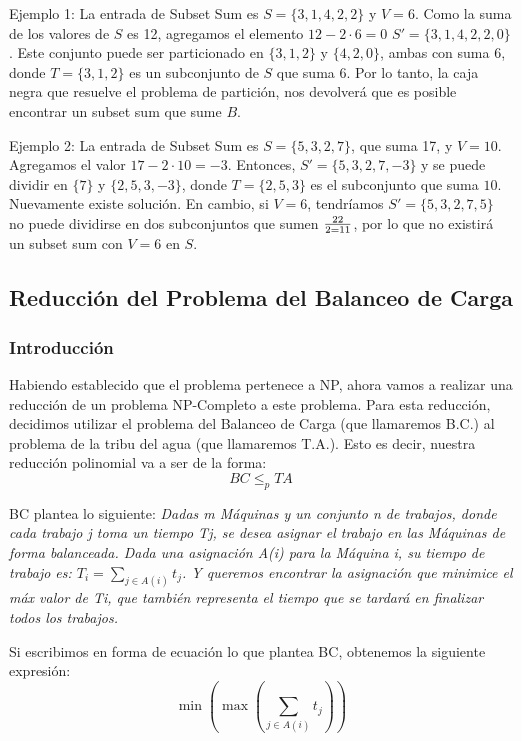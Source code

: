 \documentclass{article}
\begin{document}
Ejemplo 1: La entrada de Subset Sum es \( S = \{3, 1, 4, 2, 2\} \) y \( V = 6 \). Como la suma de los valores de $S$ es 12, agregamos el elemento $12 - 2 \cdot 6 = 0$ \( S' = \{3, 1, 4, 2, 2, 0\} \). Este conjunto puede ser particionado en \( \{3, 1, 2\} \) y \( \{4, 2, 0\} \), ambas con suma 6, donde \( T = \{3, 1, 2\} \) es un subconjunto de \( S \) que suma \( 6 \). Por lo tanto, la caja negra que resuelve el problema de partición, nos devolverá que es posible encontrar un subset sum que sume $B$.

Ejemplo 2: La entrada de Subset Sum es \( S = \{5, 3, 2, 7\} \), que suma 17, y \( V = 10 \). Agregamos el valor $17 - 2 \cdot 10 = -3$. Entonces, \( S' = \{5, 3, 2, 7, -3\} \) y se puede dividir en  \( \{7\} \) y \( \{2, 5, 3, -3\} \), donde \( T = \{2, 5, 3\} \) es el subconjunto que suma \( 10 \). Nuevamente existe solución. En cambio, si $V = 6$, tendríamos \( S' = \{5, 3, 2, 7, 5\} \) no puede dividirse en dos subconjuntos que sumen $22 \over 2 = 11$, por lo que no existirá un subset sum con $V = 6$ en $S$.

\subsection{Reducción del Problema del Balanceo de Carga}
\subsubsection{Introducción}
Habiendo establecido que el problema pertenece a NP, ahora vamos a realizar una reducción de un problema NP-Completo a este problema.
Para esta reducción, decidimos utilizar el problema del Balanceo de Carga (que llamaremos B.C.) al problema de la tribu del agua (que llamaremos T.A.). Esto es decir, nuestra reducción polinomial va a ser de la forma:
$$
BC \leq_p TA
$$

BC plantea lo siguiente: 
\textit{Dadas m Máquinas y un conjunto n de trabajos, donde cada trabajo j toma un tiempo Tj, se desea asignar el trabajo en las Máquinas de forma balanceada. Dada una asignación A(i) para la Máquina i, su tiempo de trabajo es: $T_{i} =\displaystyle{\sum_{j \in A(i)} t_j}$. Y queremos encontrar la asignación que minimice el máx valor de Ti, que también representa el tiempo que se tardará en finalizar todos los trabajos.}

Si escribimos en forma de ecuación lo que plantea BC, obtenemos la siguiente expresión:
$$
\min( \max (\displaystyle{\sum_{j \in A(i)} t_j}))
$$
\end{document}
